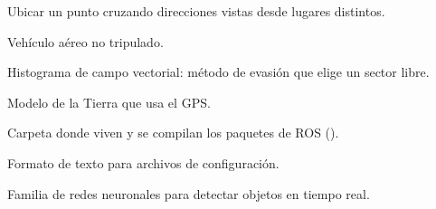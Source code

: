 \begin{description}[style=nextline,leftmargin=0.6cm]
  \item[Triangulación] Ubicar un punto cruzando direcciones vistas desde lugares distintos.
  \item[UAV] Vehículo aéreo no tripulado.
  \item[VFH] Histograma de campo vectorial: método de evasión que elige un sector libre.
  \item[WGS84] Modelo de la Tierra que usa el GPS.
  \item[Workspace] Carpeta donde viven y se compilan los paquetes de ROS ().
  \item[YAML] Formato de texto para archivos de configuración.
  \item[YOLO] Familia de redes neuronales para detectar objetos en tiempo real.
\end{description}
